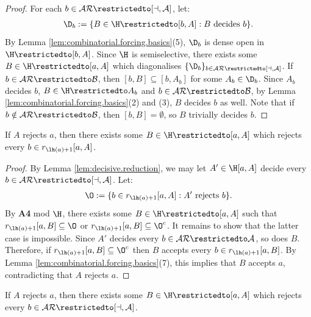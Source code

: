\documentclass[11pt,reqno]{amsart}
\begin{document}
\begin{proof}
     For each $b \in \cal{AR}\restrictedto[a,A]$, let:
     \begin{align*}
        \D_b := \{B \in \H\restrictedto[b,A] : B \text{ decides } b\}.
     \end{align*}
     By Lemma \ref{lem:combinatorial.forcing.basics}(5), $\D_b$ is dense open in $\H\restrictedto[b,A]$. Since $\H$ is semiselective, there exists some $B \in \H\restrictedto[a,A]$ which diagonalises $\{\D_b\}_{b\in\cal{AR}\restrictedto[a,A]}$. If $b \in \cal{AR}\restrictedto B$, then $[b,B] \subseteq [b,A_b]$ for some $A_b \in \D_b$. Since $A_b$ decides $b$, $B \in \H\restrictedto A_b$ and $b \in \cal{AR}\restrictedto B$, by Lemma \ref{lem:combinatorial.forcing.basics}(2) and (3), $B$ decides $b$ as well. Note that if $b \notin \cal{AR}\restrictedto B$, then $[b,B] = \emptyset$, so $B$ trivially decides $b$.
\end{proof}

\begin{lemma}
\label{lem:one-point.reject.reduction}
    If $A$ rejects $a$, then there exists some $B \in \H\restrictedto[a,A]$ which rejects every $b \in r_{\lh(a)+1}[a,A]$.
\end{lemma}

\begin{proof}
    By Lemma \ref{lem:decisive.reduction}, we may let $A' \in \H[a,A]$ decide every $b \in \cal{AR}\restrictedto[a,A]$. Let:
    \begin{align*}
        \O := \{b \in r_{\lh(a)+1}[a,A] : A' \text{ rejects } b\}.
    \end{align*}
    By \textbf{A4} mod $\H$, there exists some $B \in \H\restrictedto[a,A]$ such that $r_{\lh(a)+1}[a,B] \subseteq \O$ or $r_{\lh(a)+1}[a,B] \subseteq \O^c$. It remains to show that the latter case is impossible. Since $A'$ decides every $b \in \cal{AR}\restrictedto A$, so does $B$. Therefore, if $r_{\lh(a)+1}[a,B] \subseteq \O^c$ then $B$ accepts every $b \in r_{\lh(a)+1}[a,B]$. By Lemma \ref{lem:combinatorial.forcing.basics}(7), this implies that $B$ accepts $a$, contradicting that $A$ rejects $a$.
\end{proof}

\begin{lemma}
\label{lem:completely.reject.reduction}
    If $A$ rejects $a$, then there exists some $B \in \H\restrictedto[a,A]$ which rejects every $b \in \cal{AR}\restrictedto[a,A]$. 
\end{lemma}
\end{document}
